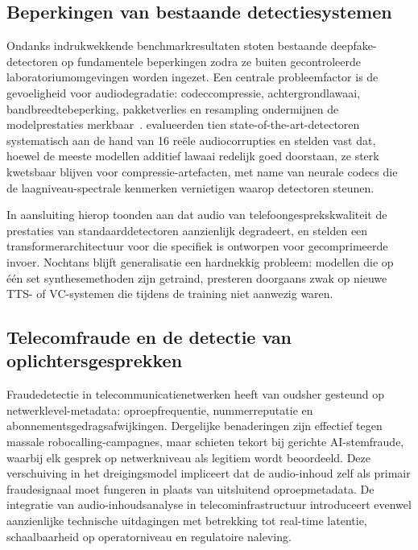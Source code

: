 \documentclass{hogent-article}
\begin{document}
\subsection{Beperkingen van bestaande detectiesystemen}

Ondanks indrukwekkende benchmarkresultaten stoten bestaande deepfake-detectoren
op fundamentele beperkingen zodra ze buiten gecontroleerde laboratoriumomgevingen
worden ingezet. Een centrale probleemfactor is de gevoeligheid voor
audiodegradatie: codeccompressie, achtergrondlawaai, bandbreedtebeperking,
pakketverlies en resampling ondermijnen de modelprestaties
merkbaar~\autocite{Shi2025}. \textcite{Li2025} evalueerden tien
state-of-the-art-detectoren systematisch aan de hand van 16 reële
audiocorrupties en stelden vast dat, hoewel de meeste modellen additief lawaai
redelijk goed doorstaan, ze sterk kwetsbaar blijven voor compressie-artefacten, met name van neurale
codecs die de laagniveau-spectrale kenmerken vernietigen waarop detectoren steunen.

In aansluiting hierop toonden \textcite{Yadav2024} aan dat audio van
telefoongesprekskwaliteit de prestaties van standaarddetectoren aanzienlijk
degradeert, en stelden een transformerarchitectuur voor die specifiek is ontworpen
voor gecomprimeerde invoer. Nochtans blijft generalisatie een
hardnekkig probleem: modellen die op één set synthesemethoden zijn getraind,
presteren doorgaans zwak op nieuwe TTS- of VC-systemen die tijdens de training
niet aanwezig waren.

\subsection{Telecomfraude en de detectie van oplichtersgesprekken}

Fraudedetectie in telecommunicatienetwerken heeft van oudsher gesteund op
netwerklevel-metadata: oproepfrequentie, nummerreputatie en
abonnementsgedragsafwijkingen. Dergelijke benaderingen zijn effectief tegen
massale robocalling-campagnes, maar schieten tekort bij gerichte AI-stem\-fraude,
waarbij elk gesprek op netwerkniveau als legitiem wordt beoordeeld. Deze
verschuiving in het dreigingsmodel impliceert dat de audio-inhoud zelf als
primair fraudesignaal moet fungeren in plaats van uitsluitend oproepmetadata.
De integratie van audio-inhoudsanalyse in telecominfrastructuur introduceert
evenwel aanzienlijke technische uitdagingen met betrekking tot real-time
latentie, schaalbaarheid op operatorniveau en regulatoire naleving.
\end{document}
